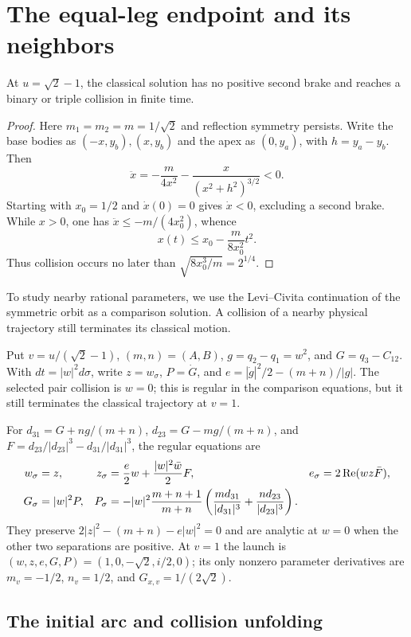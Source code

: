 \section{The equal-leg endpoint and its neighbors}\label{sec:iso}

\begin{theorem}
At $u=\sqrt2-1$, the classical solution has no positive second brake and
reaches a binary or triple collision in finite time.
\end{theorem}
\begin{proof}
Here $m_1=m_2=m=1/\sqrt2$ and reflection symmetry persists.  Write the base
bodies as $(-x,y_b),(x,y_b)$ and the apex as $(0,y_a)$, with
$h=y_a-y_b$.  Then
\[
\ddot x=-\frac{m}{4x^2}-\frac{x}{(x^2+h^2)^{3/2}}<0.
\]
Starting with $x_0=1/2$ and $\dot x(0)=0$ gives $\dot x<0$, excluding a
second brake.  While $x>0$, one has
$\ddot x\leq-m/(4x_0^2)$, whence
\[
x(t)\leq x_0-\frac{m}{8x_0^2}t^2.
\]
Thus collision occurs no later than $\sqrt{8x_0^3/m}=2^{1/4}$.
\end{proof}

To study nearby rational parameters, we use the Levi--Civita continuation
of the symmetric orbit as a comparison solution. A collision of a nearby
physical trajectory still terminates its classical motion.

Put $v=u/(\sqrt2-1)$, $(m,n)=(A,B)$, $g=q_2-q_1=w^2$, and
$G=q_3-C_{12}$. With $dt=|w|^2d\sigma$, write $z=w_\sigma$, $P=\dot G$,
and $e=|\dot g|^2/2-(m+n)/|g|$. The selected pair collision is $w=0$;
this is regular in the comparison equations, but it still terminates the
classical trajectory at $v=1$.

For $d_{31}=G+ng/(m+n)$, $d_{23}=G-mg/(m+n)$, and
$F=d_{23}/|d_{23}|^3-d_{31}/|d_{31}|^3$, the regular equations are
\[
\begin{aligned}
 w_\sigma&=z,&
 z_\sigma&={e\over2}w+{|w|^2\bar w\over2}F,&
 e_\sigma&=2\operatorname{Re}(wz\bar F),\\
 G_\sigma&=|w|^2P,&
 P_\sigma&=-|w|^2{m+n+1\over m+n}
 \left({m d_{31}\over|d_{31}|^3}+{n d_{23}\over|d_{23}|^3}\right).
\end{aligned}
\]
They preserve $2|z|^2-(m+n)-e|w|^2=0$ and are analytic at $w=0$
when the other two separations are positive. At $v=1$ the launch is
$(w,z,e,G,P)=(1,0,-\sqrt2,i/2,0)$; its only nonzero parameter
derivatives are
$m_v=-1/2$, $n_v=1/2$, and $G_{x,v}=1/(2\sqrt2)$.

\subsection{The initial arc and collision unfolding}

